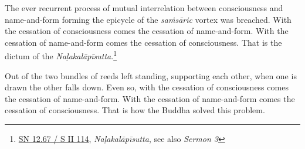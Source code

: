 The ever recurrent process of mutual interrelation between consciousness and name-and-form forming the epicycle of the \emph{saṁsāric} vortex was breached. With the cessation of consciousness comes the cessation of name-and-form. With the cessation of name-and-form comes the cessation of consciousness. That is the dictum of the \emph{Naḷakalāpīsutta}.\footnote{\href{https://suttacentral.net/sn12.67/pli/ms}{SN 12.67 / S II 114}, \emph{Naḷakalāpīsutta}, see also \emph{Sermon 3}}

Out of the two bundles of reeds left standing, supporting each other, when one is drawn the other falls down. Even so, with the cessation of consciousness comes the cessation of name-and-form. With the cessation of name-and-form comes the cessation of consciousness. That is how the Buddha solved this problem.
